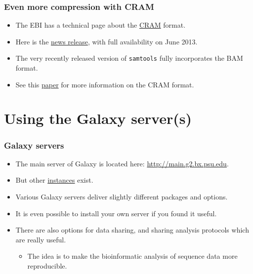\documentclass{beamer}
\begin{document}
\begin{frame}
  \frametitle{Even more compression with CRAM}
  \begin{itemize}
  \item The EBI has a technical page about the \href{http://www.ebi.ac.uk/ena/about/cram_toolkit}{CRAM} format.
  \item Here is the \href{http://www.ebi.ac.uk/about/news/service-news/cram-pre-launch}{news release}, with full availability on June 2013.
  \item The very recently released version of \texttt{samtools} fully incorporates the BAM format.
  \item See this \href{http://genome.cshlp.org/content/21/5/734}{paper} for more information on the CRAM format.
  \end{itemize}
\end{frame}


\section{Using the Galaxy server(s)}


\begin{frame}
  \frametitle{Galaxy servers}
  \begin{itemize}
  \item The main server of Galaxy is located here:  \href{http://main.g2.bx.psu.edu}{http://main.g2.bx.psu.edu}.
  \item But other \href{http://wiki.g2.bx.psu.edu/PublicGalaxyServers?action=show&redirect=Public+Galaxy+Servers}{instances}  exist.
  \item Various Galaxy servers deliver slightly different packages and options.
  \item It is even possible to install your own server if you found it useful.
  \item There are also options for data sharing, and sharing analysis protocols which are really useful.
    \begin{itemize}
    \item The idea is to make the bioinformatic analysis of sequence data more reproducible.
    \end{itemize}
  \end{itemize}
\end{frame}
\end{document}
